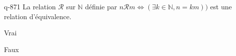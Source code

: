 \begin{truefalse}{q-871}
La relation $\mathcal R$ sur $\mathbb N$ définie par $n\mathcal R m \iff (\exists k\in\mathbb N,n=km))$ est une relation d'équivalence.
\item Vrai
\item* Faux
\end{truefalse}

